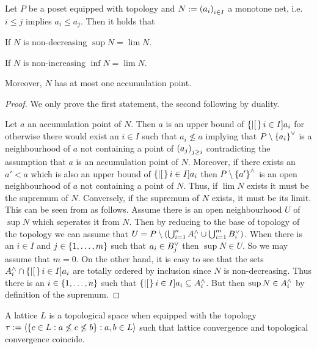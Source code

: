 \documentclass[8pt,a4paper]{article}
\begin{document}
\begin{lemma}
    Let $P$ be a poset equipped with  topology and $N:=\net[i\in I]{a_i}$ a monotone net, i.e. $i\leq j$ implies $a_i\leq a_j$. Then it holds that
    \begin{statements}
            \item If $N$ is non-decreasing $\sup{N}=\lim{N}$.
            \item If $N$ is non-increasing $\inf{N}=\lim{N}$.
    \end{statements}
    Moreover, $N$ has at most one accumulation point.
\end{lemma}

\begin{proof}
    We only prove the first statement, the second following by duality.
    
    Let $a$ an accumulation point of $N$. Then $a$ is an upper bound of $\set[i\in I]{a_i}$ for otherwise there would exist an $i\in I$ such that $a_i\not\leq a$ implying that $P\setminus \set{a_i}^{\join}$ is a neighbourhood of $a$ not containing a point of $\net[j\geq i]{a_j}$ contradicting the assumption that $a$ is an accumulation point of $N$. Moreover, if there exists an $a'<a$ which is also an upper bound of $\set[i\in I]{a_i}$ then $P\setminus\set{a'}^{\meet}$ is an open neighbourhood of $a$ not containing a point of $N$. Thus, if $\lim{N}$ exists it must be the supremum of $N$. Conversely, if the supremum of $N$ exists, it must be its limit. This can be seen from as follows. Assume there is an open neighbourhood $U$ of $\sup{N}$ which seperates it from $N$. Then by reducing to the base of topology of the  topology we can assume that $U=P\setminus(\bigcup_{i=1}^n{A_i^{\wedge}}\cup\bigcup_{i=1}^m{B_i^{\vee}})$. When there is an $i\in I$ and $j\in\set{1,\ldots,m}$ such that $a_i\in B_j^{\vee}$ then $\sup{N}\in U$. So we may assume that $m=0$. On the other hand, it is easy to see that the sets $A_i^{\meet}\setmeet\set[i\in I]{a_i}$ are totally ordered by inclusion since $N$ is non-decreasing. Thus there is an $i\in\set{1,\ldots,n}$ such that $\set[i\in I]{a_i}\setleq A_i^{\meet}$. But then $\sup{N}\in A_i^{\wedge}$ by definition of the supremum.
\end{proof}

\begin{lemma}
    A lattice $L$ is a topological space when equipped with the topology
    $\tau:=\gen{\set{c\in L: a\not\leq c\not\leq b}:a,b\in L}$ such that lattice convergence and topological convergence coincide.
\end{lemma}
\end{document}
